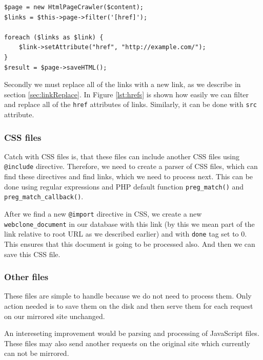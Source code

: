\begin{lstlisting}[caption={Example of finding and replacing href attributes in an HTML document},label={lst:hrefs}]
$page = new HtmlPageCrawler($content);
$links = $this->page->filter('[href]');

foreach ($links as $link) {
	$link->setAttribute("href", "http://example.com/");
}
$result = $page->saveHTML();
\end{lstlisting}

Secondly we must replace all of the links with a new link, as we describe in section \ref{sec:linkReplace}. In Figure \ref{lst:hrefs} is shown how easily we can filter and replace all of the \texttt{href} attributes of links. Similarly, it can be done with \texttt{src} attribute.

\subsubsection{CSS files}
Catch with CSS files is, that these files can include another CSS files using \texttt{@include} directive. Therefore, we need to create a parser of CSS files, which can find these directives and find links, which we need to process next. This can be done using regular expressions and PHP default function \texttt{preg\_match()} and \texttt{preg\_match\_callback()}.

After we find a new \texttt{@import} directive in CSS, we create a new \texttt{webclone\_document} in our database with this link (by this we mean part of the link relative to root URL as we described earlier) and with \texttt{done} tag set to 0. This ensures that this document is going to be processed also. And then we can save this CSS file.

\subsubsection{Other files}
These files are simple to handle because we do not need to process them. Only action needed is to save them on the disk and then serve them for each request on our mirrored site unchanged.

An intereseting improvement would be parsing and processing of JavaScript files. These files may also send another requests on the original site which currently can not be mirrored.


